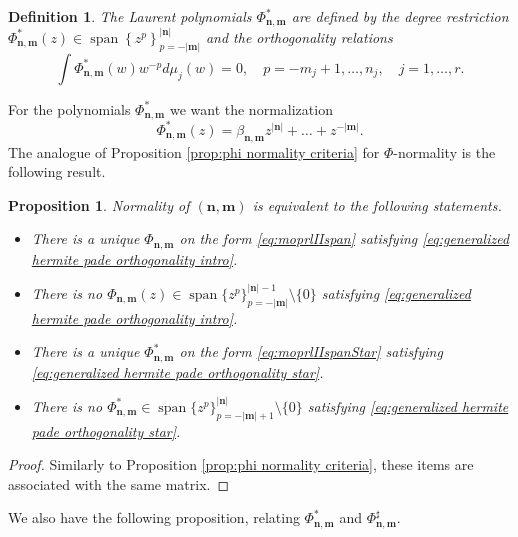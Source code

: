 \documentclass[reqno,centertags,11pt,draft]{amsart}
\newtheorem{prop}[thm]{Proposition}
\newtheorem{defn}[thm]{Definition}
\newcommand{\abs}[1]{\left|#1\right|}
\newcommand{\set}[1]{\left\{#1\right\}}
\begin{document}
\begin{defn}
    The Laurent polynomials $\Phi_{\bm{n},\bm{m}}^*$ are defined by the degree restriction $\Phi_{\bm{n},\bm{m}}^*(z) \in \operatorname{span}\set{z^p}_{p = -\abs{\bm{m}}}^{\abs{\bm{n}}}$ and the orthogonality relations
    \begin{equation}
\label{eq:generalized hermite pade orthogonality star}
    \int \Phi_{\bm{n},\bm{m}}^*(w)w^{-p}d\mu_j(w) = 0, \quad p = -m_j+1,\dots,n_j, \quad j = 1,\dots,r.
\end{equation}
\end{defn}
For the polynomials $\Phi_{\bm{n},\bm{m}}^*$ we want the normalization
\begin{equation}\label{eq:moprlIIspanStar}
    \Phi_{\bm{n},\bm{m}}^*(z) = \beta_{\bm{n},\bm{m}}z^{\abs{\bm{n}}} + \ldots + z^{-\abs{\bm{m}}}.
\end{equation}
The analogue of Proposition \ref{prop:phi normality criteria} for $\Phi$-normality is the following result. 
\begin{prop}\label{prop:normality criteria hp}
    Normality of $(\bm{n},\bm{m})$ is equivalent to the following statements.
    \begin{itemize}
        \item There is a unique $\Phi_{\bm{n},\bm{m}}$ on the form \eqref{eq:moprlIIspan} satisfying \eqref{eq:generalized hermite pade orthogonality intro}.
        \item There is no $\Phi_{\bm{n},\bm{m}}(z) \in \operatorname{span}\{z^p\}_{p = -\abs{\bm{m}}}^{\abs{\bm{n}}-1}\setminus\{0\}$ satisfying \eqref{eq:generalized hermite pade orthogonality intro}.
        \item There is a unique $\Phi_{\bm{n},\bm{m}}^*$ on the form \eqref{eq:moprlIIspanStar} satisfying \eqref{eq:generalized hermite pade orthogonality star}.
        \item There is no $\Phi_{\bm{n},\bm{m}}^* \in \operatorname{span}\{z^p\}_{p = -\abs{\bm{m}}+1}^{\abs{\bm{n}}}\setminus\{0\}$ satisfying \eqref{eq:generalized hermite pade orthogonality star}.
    \end{itemize}
\end{prop}

\begin{proof}
    Similarly to Proposition \ref{prop:phi normality criteria}, these items are associated with the same matrix. 
\end{proof}

We also have the following proposition, relating $\Phi_{\bm{n},\bm{m}}^*$ and $\Phi_{\bm{n},\bm{m}}^\sharp$. 
\end{document}
